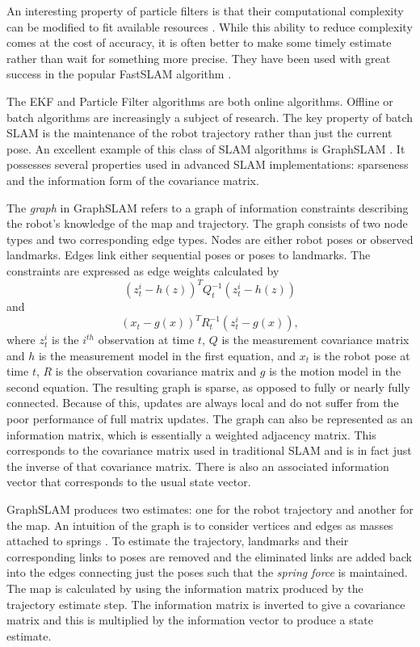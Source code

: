 \documentclass[12pt]{article}
\begin{document}
An interesting property of particle filters is that their computational complexity can be modified to fit available resources \cite{ThrunPR2005}.  While this ability to reduce complexity comes at the cost of accuracy, it is often better to make some timely estimate rather than wait for something more precise.  They have been used with great success in the popular FastSLAM algorithm \cite{montemerlo2003fastslam}.

The EKF and Particle Filter algorithms are both online algorithms.  Offline or batch algorithms are increasingly a subject of research.  The key property of batch SLAM is the maintenance of the robot trajectory rather than just the current pose.   An excellent example of this class of SLAM algorithms is GraphSLAM \cite{Thrun05GS}.  It possesses several properties used in advanced SLAM implementations: sparseness and the information form of the covariance matrix.

The \emph{graph} in GraphSLAM refers to a graph of information constraints describing the robot's knowledge of the map and trajectory.  The graph consists of two node types and two corresponding edge types.  Nodes are either robot poses or observed landmarks.  Edges link either sequential poses or poses to landmarks.  The constraints are expressed as edge weights calculated by 
\begin{equation}\label{constraint1}
(z_{t}^{i} - h(z))^TQ_{t}^{-1}(z_{t}^{i} - h(z)) 
\end{equation}
and 
\begin{equation}\label{constraint2}
(x_{t} - g(x))^TR_{t}^{-1}(z_{t}^{i} - g(x)),
\end{equation}
 where $z_t^i$ is the $i^{th}$ observation at time $t$, $Q$ is the measurement covariance matrix and $h$ is the measurement model in the first equation, and $x_{t}$ is the robot pose at time $t$, $R$ is the observation covariance matrix and $g$ is the motion model in the second equation.  The resulting graph is sparse, as opposed to fully or nearly fully connected.  Because of this, updates are always local and do not suffer from the poor performance of full matrix updates.  The graph can also be represented as an information matrix, which is essentially a weighted adjacency matrix.  This corresponds to the covariance matrix used in traditional SLAM and is in fact just the inverse of that covariance matrix.  There is also an associated information vector that corresponds to the usual state vector.  

GraphSLAM produces two estimates: one for the robot trajectory and another for the map.  An intuition of the graph is to consider vertices and edges as masses attached to springs \cite{Thrun05GS}.  To estimate the trajectory, landmarks and their corresponding links to poses are removed and the eliminated links are added back into the edges connecting just the poses such that the \emph{spring force} is maintained.  The map is calculated by using the information matrix produced by the trajectory estimate step.  The information matrix is inverted to give a covariance matrix and this is multiplied by the information vector to produce a state estimate.  
\end{document}
